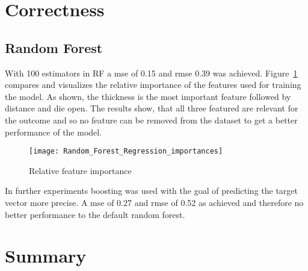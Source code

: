 \section{Correctness}
\subsection{Random Forest} 
With 100 estimators in \ac{RF} a \ac{mse} of 0.15 and \ac{rmse} 0.39 was achieved. 
Figure~\ref{fig:rf_feature_importance} compares and visualizes the relative importance of the features used for training the model. 
As shown, the thickness is the most important feature followed by distance and die open. The results show, that all three featured are relevant for the outcome and so no feature can be removed from the dataset to get a better performance of the model. 


\begin{figure}[H]
    \centering
    \texttt{[image: Random\_Forest\_Regression\_importances]}
    \caption{Relative feature importance}
    \label{fig:rf_feature_importance}
\end{figure}

In further experiments boosting was used with the goal of predicting the target vector more precise. A \ac{mse} of 0.27 and \ac{rmse} of 0.52 as achieved and therefore no better performance to the default random forest. 








\section{Summary}